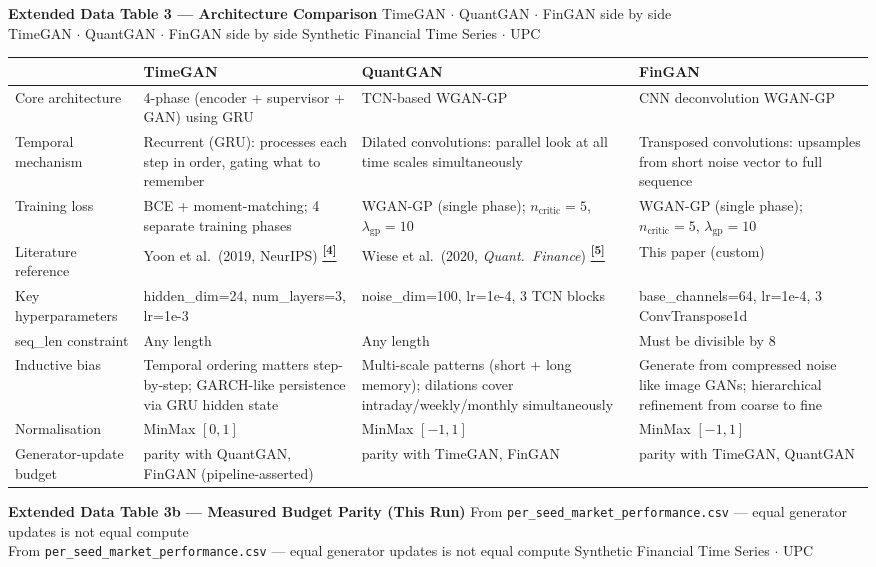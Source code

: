 \documentclass[10pt]{article}
\newcommand{\pagehead}[2]{%
  \begin{tcolorbox}[enhanced,arc=0pt,outer arc=0pt,boxrule=0pt,
    colback=Navy,colframe=Navy,
    top=5pt,bottom=5pt,left=8pt,right=8pt,
    before skip=0pt,after skip=10pt]
  {\color{white}\large\bfseries #1}%
  \ifx\relax#2\relax\else\\[1pt]{\color{blue!30!white}\small #2}\fi
  \hfill{\color{blue!20!white}\footnotesize Synthetic Financial Time Series $\cdot$ UPC}
  \end{tcolorbox}}
\newcommand{\tcite}[1]{%
  \hyperlink{R:#1}{\textsuperscript{\scriptsize\textbf{[#1]}}}}
\begin{document}
\clearpage

\pagehead{Extended Data Table 3 --- Architecture Comparison}
         {TimeGAN $\cdot$ QuantGAN $\cdot$ FinGAN side by side}

\vspace{4pt}
{\small
\begin{tabularx}{\linewidth}{@{}lXXX@{}}
\toprule
 & \textbf{\textcolor{TGcol}{TimeGAN}} & \textbf{\textcolor{QGcol}{QuantGAN}} & \textbf{\textcolor{FGcol}{FinGAN}} \\
\midrule
Core architecture & 4-phase (encoder + supervisor + GAN) using GRU & TCN-based WGAN-GP & CNN deconvolution WGAN-GP \\
Temporal mechanism & Recurrent (GRU): processes each step in order, gating what to remember & Dilated convolutions: parallel look at all time scales simultaneously & Transposed convolutions: upsamples from short noise vector to full sequence \\
Training loss & BCE + moment-matching; 4 separate training phases & WGAN-GP (single phase); $n_\text{critic}=5$, $\lambda_\text{gp}=10$ & WGAN-GP (single phase); $n_\text{critic}=5$, $\lambda_\text{gp}=10$ \\
Literature reference & Yoon et al.\ (2019, NeurIPS)\tcite{4} & Wiese et al.\ (2020, \textit{Quant.\ Finance})\tcite{5} & This paper (custom) \\
Key hyperparameters & hidden\_dim=24, num\_layers=3, lr=1e-3 & noise\_dim=100, lr=1e-4, 3 TCN blocks & base\_channels=64, lr=1e-4, 3 ConvTranspose1d \\
seq\_len constraint & Any length & Any length & Must be divisible by 8 \\
Inductive bias & Temporal ordering matters step-by-step; GARCH-like persistence via GRU hidden state & Multi-scale patterns (short + long memory); dilations cover intraday/weekly/monthly simultaneously & Generate from compressed noise like image GANs; hierarchical refinement from coarse to fine \\
Normalisation & MinMax $[0,1]$ & MinMax $[-1,1]$ & MinMax $[-1,1]$ \\
Generator-update budget & parity with QuantGAN, FinGAN (pipeline-asserted) & parity with TimeGAN, FinGAN & parity with TimeGAN, QuantGAN \\
\bottomrule
\end{tabularx}}

\vspace{8pt}
\pagehead{Extended Data Table 3b --- Measured Budget Parity (This Run)}
         {From \texttt{per\_seed\_market\_performance.csv} --- equal generator updates is not equal compute}
\end{document}
